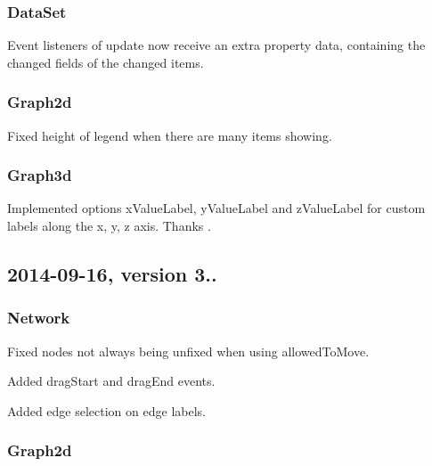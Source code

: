 \subsubsection*{Data\+Set}


\begin{DoxyItemize}
\item Event listeners of {\ttfamily update} now receive an extra property {\ttfamily data}, containing the changed fields of the changed items.
\end{DoxyItemize}

\subsubsection*{Graph2d}


\begin{DoxyItemize}
\item Fixed height of legend when there are many items showing.
\end{DoxyItemize}

\subsubsection*{Graph3d}


\begin{DoxyItemize}
\item Implemented options {\ttfamily x\+Value\+Label}, {\ttfamily y\+Value\+Label} and {\ttfamily z\+Value\+Label} for custom labels along the x, y, z axis. Thanks .
\end{DoxyItemize}

\subsection*{2014-\/09-\/16, version 3..}

\subsubsection*{Network}


\begin{DoxyItemize}
\item Fixed nodes not always being unfixed when using allowed\+To\+Move.
\item Added drag\+Start and drag\+End events.
\item Added edge selection on edge labels.
\end{DoxyItemize}

\subsubsection*{Graph2d}


